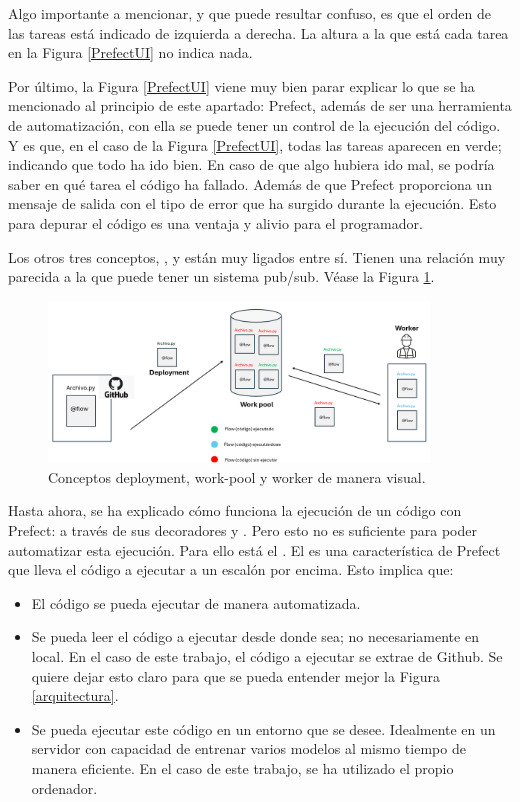 Algo importante a mencionar, y que puede resultar confuso, es que el orden de las tareas está indicado de izquierda a derecha. La altura a  la que está cada tarea en la Figura \ref{PrefectUI} no indica nada.

Por último, la Figura \ref{PrefectUI} viene muy bien parar explicar lo que se ha mencionado al principio de este apartado: Prefect, además de ser una herramienta de automatización, con ella se puede tener un control de la ejecución del código. Y es que, en el caso de la Figura \ref{PrefectUI}, todas las tareas aparecen en verde; indicando que todo  ha ido bien. En caso de que algo hubiera ido mal, se podría saber en qué tarea el código ha fallado. Además de que Prefect proporciona un mensaje de salida con el tipo de error que ha surgido durante la ejecución. Esto para depurar el código es una ventaja y alivio para el programador.


Los otros tres conceptos, ,  y  están muy ligados entre sí. Tienen una relación muy parecida a la que puede tener un sistema pub/sub. Véase la Figura \ref{prefectArq}.

\begin{figure}[H]
    \centering
    \includegraphics[width = 0.9\textwidth]{imgs/prefect_arquitectura.png}
    \caption{Conceptos deployment, work-pool y worker de manera visual.}
    \label{prefectArq}
\end{figure}

Hasta ahora, se ha explicado cómo funciona la ejecución de un código con Prefect: a través de sus decoradores  y . Pero esto no es suficiente para poder automatizar esta ejecución. Para ello está el . El  es una característica de Prefect que lleva el código a ejecutar a un escalón por encima. Esto implica que:
\begin{itemize}
	\item El código se pueda ejecutar de manera automatizada.
	\item Se pueda leer el código a ejecutar desde donde sea; no necesariamente en local. En el caso de este trabajo, el código a ejecutar se extrae de Github. Se quiere dejar esto claro para que se pueda entender mejor la Figura \ref{arquitectura}.
	\item Se pueda ejecutar este código en un entorno que se desee. Idealmente en un servidor con capacidad de entrenar varios modelos al mismo tiempo de manera eficiente. En el caso de este trabajo, se ha utilizado el propio ordenador.
\end{itemize}

